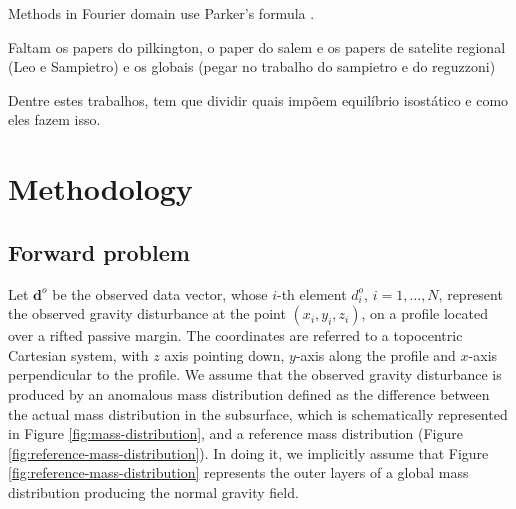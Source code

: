\documentclass[manuscript]{geophysics}
\begin{document}
Methods in Fourier domain use Parker's formula \citep{parker1973}.

Faltam os papers do pilkington, o paper do salem e os papers de satelite regional (Leo e Sampietro) e os globais (pegar no trabalho do sampietro e do reguzzoni)

Dentre estes trabalhos, tem que dividir quais impõem equilíbrio isostático e como
eles fazem isso.


\section{Methodology}


\subsection{Forward problem}


Let $\mathbf{d}^{o}$ be the observed data vector, whose $i$-th element $d^{o}_{i}$, 
$i = 1, \dots, N$, represent the observed gravity disturbance at the point 
$(x_{i}, y_{i}, z_{i})$, on a profile located over a rifted passive margin. The
coordinates are referred to a topocentric Cartesian system, with $z$ axis pointing
down, $y$-axis along the profile and $x$-axis perpendicular to the profile. 
We assume that the observed gravity disturbance is produced by an anomalous 
mass distribution defined as the difference between the actual mass distribution
in the subsurface, which is schematically represented in Figure \ref{fig:mass-distribution},
and a reference mass distribution (Figure \ref{fig:reference-mass-distribution}).
In doing it, we implicitly assume that Figure \ref{fig:reference-mass-distribution}
represents the outer layers of a global mass distribution producing the
normal gravity field. 
\end{document}
